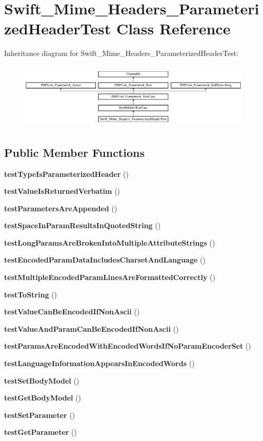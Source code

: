 \section{Swift\+\_\+\+Mime\+\_\+\+Headers\+\_\+\+Parameterized\+Header\+Test Class Reference}
\label{class_swift___mime___headers___parameterized_header_test}
Inheritance diagram for Swift\+\_\+\+Mime\+\_\+\+Headers\+\_\+\+Parameterized\+Header\+Test\+:\begin{figure}[H]
\begin{center}
\leavevmode
\includegraphics[height=3.196347cm]{class_swift___mime___headers___parameterized_header_test}
\end{center}
\end{figure}
\subsection*{Public Member Functions}
\begin{DoxyCompactItemize}
\item 
{\bf test\+Type\+Is\+Parameterized\+Header} ()
\item 
{\bf test\+Value\+Is\+Returned\+Verbatim} ()
\item 
{\bf test\+Parameters\+Are\+Appended} ()
\item 
{\bf test\+Space\+In\+Param\+Results\+In\+Quoted\+String} ()
\item 
{\bf test\+Long\+Params\+Are\+Broken\+Into\+Multiple\+Attribute\+Strings} ()
\item 
{\bf test\+Encoded\+Param\+Data\+Includes\+Charset\+And\+Language} ()
\item 
{\bf test\+Multiple\+Encoded\+Param\+Lines\+Are\+Formatted\+Correctly} ()
\item 
{\bf test\+To\+String} ()
\item 
{\bf test\+Value\+Can\+Be\+Encoded\+If\+Non\+Ascii} ()
\item 
{\bf test\+Value\+And\+Param\+Can\+Be\+Encoded\+If\+Non\+Ascii} ()
\item 
{\bf test\+Params\+Are\+Encoded\+With\+Encoded\+Words\+If\+No\+Param\+Encoder\+Set} ()
\item 
{\bf test\+Language\+Information\+Appears\+In\+Encoded\+Words} ()
\item 
{\bf test\+Set\+Body\+Model} ()
\item 
{\bf test\+Get\+Body\+Model} ()
\item 
{\bf test\+Set\+Parameter} ()
\item 
{\bf test\+Get\+Parameter} ()
\end{DoxyCompactItemize}
